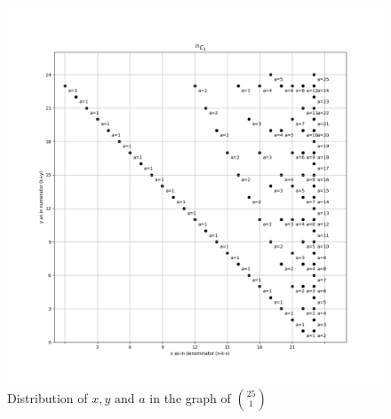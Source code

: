 \documentclass[10pt, twoside]{article}
\newcommand*{\Combination}[2]{\binom{#1}{#2}}%
\begin{document}
\begin{appendices}
\begin{figure}[ph!]
\includegraphics[width=\linewidth]{25_1_alone.png}
\caption{Distribution of $x,y \text{ and } a$ in the graph of $\Combination{25}{1}$}
\label{25_C_1_example}
\end{figure}
\end{appendices}
\end{document}
